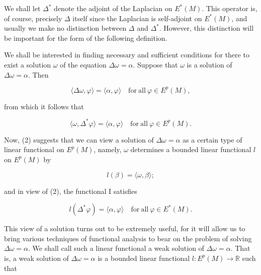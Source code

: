 \begin{definition}\label{thm:6.4}
We shall let $\Delta^{*}$ denote the adjoint of the Laplacian on $E^{*}(M)$. This operator is, of course, precisely $\Delta$ itself since the Laplacian is self-adjoint on $E^{*}(M)$, and usually we make no distinction between $\Delta$ and $\Delta^{*}$. However, this distinction will be important for the form of the following definition.

We shall be interested in finding necessary and sufficient conditions for there to exist a solution  $ \omega $ of the equation  $ \Delta\omega = \alpha $. Suppose that  $ \omega $ is a solution of  $ \Delta\omega = \alpha $. Then

\begin{equation}
\tag{1}\label{eq:6.4:1}
\langle\Delta\omega,\varphi\rangle=\langle\alpha,\varphi\rangle\quad\mathrm{for\ all}\ \varphi\in E^{p}(M),
\end{equation}

from which it follows that

\begin{equation}
\tag{2}\label{eq:6.4:2}
\langle\omega,\Delta^{*}\varphi\rangle=\langle\alpha,\varphi\rangle\quad\mathrm{for\ all}\ \varphi\in E^{p}(M).
\end{equation}

Now, (2) suggests that we can view a solution of $\Delta\omega = \alpha$ as a certain type of linear functional on $E^{p}(M)$, namely, $\omega$ determines a bounded linear functional $l$ on $E^{p}(M)$ by

\begin{equation}
\tag{3}\label{eq:6.4:3}
l(\beta)=\langle\omega,\beta\rangle;
\end{equation}

and in view of (2), the functional I satisfies

\begin{equation}
\tag{4}\label{eq:6.4:4}
l(\Delta^{*}\varphi)=\langle\alpha,\varphi\rangle\quad\mathrm{for\ all}\ \varphi\in E^{*}(M).
\end{equation}

This view of a solution turns out to be extremely useful, for it will allow us to bring various techniques of functional analysis to bear on the problem of solving $\Delta\omega = \alpha$. We shall call such a linear functional a weak solution of $\Delta\omega = \alpha$. That is, a weak solution of $\Delta\omega = \alpha$ is a bounded linear functional $l: E^p(M) \to \mathbb{R}$ such that 


\end{definition}
